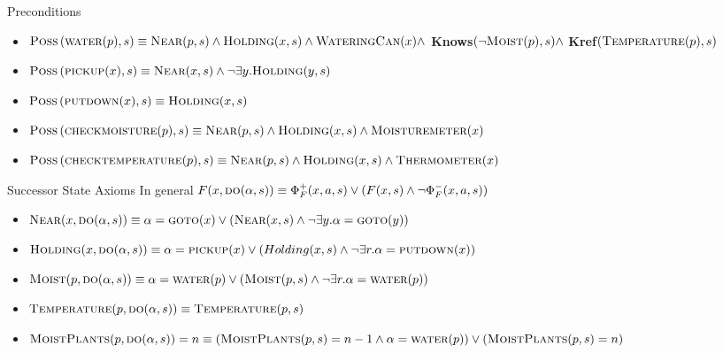 \begin{frame}{Preconditions}
    \begin{itemize}
        \item $\textsc{Poss}\left( \textsc{water}(p), s \right) \equiv \textsc{Near}(p,s) \land \textsc{Holding}(x,s) \land \textsc{WateringCan}(x) \land$ \textbf{Knows}$(\neg\textsc{Moist}(p),s) \land $ \textbf{Kref}$(\textsc{Temperature}(p),s)$
        \item $\textsc{Poss}\left( \textsc{pickup}(x), s \right) \equiv \textsc{Near}(x,s) \land \neg \exists y.\textsc{Holding}(y,s)$
        \item $\textsc{Poss}\left( \textsc{putdown}(x), s \right) \equiv \textsc{Holding}(x,s)$
        \item $\textsc{Poss}\left( \textsc{checkmoisture}(p), s \right) \equiv \textsc{Near}(p,s) \land \textsc{Holding}(x,s) \land \textsc{Moisturemeter}(x)$
        \item $\textsc{Poss}\left( \textsc{checktemperature}(p), s \right) \equiv \textsc{Near}(p,s) \land \textsc{Holding}(x,s) \land \textsc{Thermometer}(x)$
    \end{itemize}
\end{frame}

\begin{frame}{Successor State Axioms}
    In general $F(x,\textsc{do}(\alpha,s)) \equiv \Phi_F^+(x,a,s) \lor (F(x,s) \land \neg \Phi_F^-(x,a,s))$
    \vspace*{0.5cm}
    \begin{itemize}
        \item $\textsc{Near}(x,\textsc{do}(\alpha,s)) \equiv \alpha = \textsc{goto}(x)
        \lor \left( \textsc{Near}(x,s) \land \neg \exists
        y.\alpha=\textsc{goto}(y)\right)$
        \item $\textsc{Holding}(x,\textsc{do}(\alpha,s))\equiv \alpha = \textsc{pickup}(x) \lor \left( Holding(x,s) \land \neg \exists r.\alpha=\textsc{putdown}(x)\right)$
        \item $\textsc{Moist}(p,\textsc{do}(\alpha,s)) \equiv \alpha = \textsc{water}(p) \lor \left( \textsc{Moist}(p,s) \land \neg \exists r.\alpha = \textsc{water}(p) \right)$ 
        \item $\textsc{Temperature}(p,\textsc{do}(\alpha,s)) \equiv \textsc{Temperature}(p,s)$ 
        \item $\textsc{MoistPlants}(p,\textsc{do}(\alpha,s)) = n \equiv \left( \textsc{MoistPlants}(p,s) = n-1 \land \alpha = \textsc{water}(p) \right) 
        \lor \left( \textsc{MoistPlants}(p,s) = n\right)$
    \end{itemize}
\end{frame}

